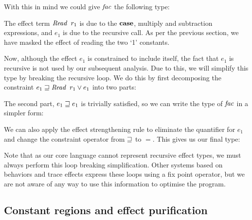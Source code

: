 With this in mind we could give $\operatorname{\mathit{fac}}$ the following type:


The effect term $\operatorname{\mathit{Read}} \ r_1$ is due to the $\textrm{\textbf{case}}$, multiply and subtraction expressions, and $e_1$ is due to the recursive call. As per the previous section, we have masked the effect of reading the two `1' constants.

Now, although the effect $e_1$ is constrained to include itself, the fact that $e_1$ is recursive is not used by our subsequent analysis. Due to this, we will simplify this type by breaking the recursive loop. We do this by first decomposing the constraint $e_1 \sqsupseteq \operatorname{\mathit{Read}} \ r_1 \lor e_1$ into two parts:


The second part, $e_1 \sqsupseteq e_1$ is trivially satisfied, so we can write the type of $\operatorname{\mathit{fac}}$ in a simpler form:


We can also apply the effect strengthening rule to eliminate the quantifier for $e_1$ and change the constraint operator from $\sqsupseteq$ to $=$. This gives us our final type:


Note that as our core language cannot represent recursive effect types, we must always perform this loop breaking simplification. Other systems based on behaviors and trace effects \cite{nielson:from-cml-to-its-process-algebra, skalka:trace-effects} express these loops using a fix point operator, but we are not aware of any way to use this information to optimise the program.

\subsection{Constant regions and effect purification}
\label{System:Effects:purification}

